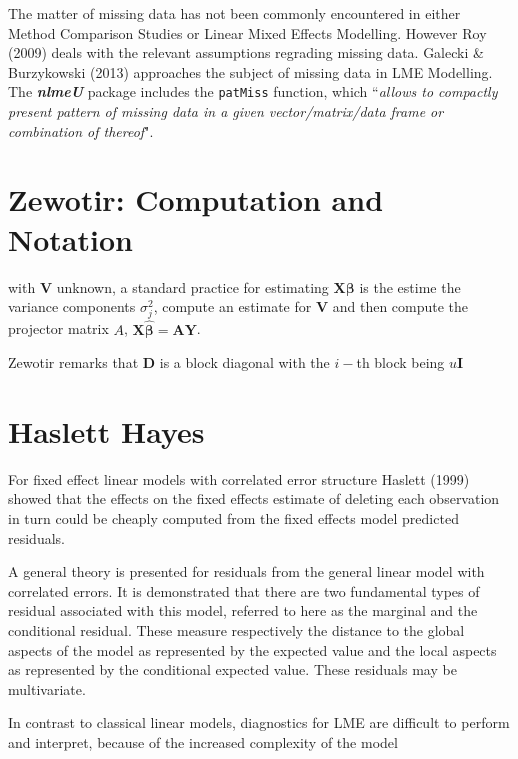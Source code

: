 \documentclass[12pt, a4paper]{report}
\theoremstyle{plain}
\theoremstyle{definition}
\theoremstyle{remark}
\begin{document}
The matter of missing data has not been commonly encountered in either Method Comparison Studies or Linear Mixed Effects Modelling. However Roy (2009) deals with the relevant assumptions regrading missing data. Galecki \& Burzykowski (2013) approaches the subject of missing data in LME Modelling. The \textbf{\textit{nlmeU}} package includes the \texttt{patMiss} function, which ``\textit{allows to compactly present pattern of missing data in a given vector/matrix/data
	frame or combination of thereof}".





	\section{Zewotir: Computation and Notation } %
	with $\boldsymbol{V}$ unknown, a standard practice for estimating $\boldsymbol{X \beta}$ is the estime the variance components $\sigma^2_j$,
	compute an estimate for $\boldsymbol{V}$ and then compute the projector matrix $A$, $\boldsymbol{X \hat{\beta}}  = \boldsymbol{AY}$.
	
	
	Zewotir remarks that $\boldsymbol{D}$ is a block diagonal with the $i-$th block being $u \boldsymbol{I}$
	\section{Haslett Hayes}                %
	
	For fixed effect linear models with correlated error structure
	Haslett (1999) showed that the effects on the fixed effects
	estimate of deleting each observation in turn could be cheaply
	computed from the fixed effects model predicted residuals.
	
	
	A general theory is presented for residuals from the general
	linear model with correlated errors. It is demonstrated that there
	are two fundamental types of residual associated with this model,
	referred to here as the marginal and the conditional residual.
	These measure respectively the distance to the global aspects of
	the model as represented by the expected value and the local
	aspects as represented by the conditional expected value. These
	residuals may be multivariate.
	
	In contrast to classical linear models, diagnostics for LME are
	difficult to perform and interpret, because of the increased
	complexity of the model
	
\end{document}
